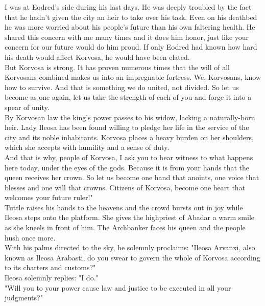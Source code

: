 I was at Eodred's side during his last days. He was deeply troubled by the fact that he hadn't given the city an heir to take over his task. Even on his deathbed he was more worried about his people's future than his own faltering health. He shared this concern with me many times and it does him honor, just like your concern for our future would do him proud. If only Eodred had known how hard his death would affect Korvosa, he would have been elated.\\

But Korvosa is strong. It has proven numerous times that the will of all Korvosans combined makes us into an impregnable fortress. We, Korvosans, know how to survive. And that is something we do united, not divided. So let us become as one again, let us take the strength of each of you and forge it into a spear of unity.\\

By Korvosan law the king's power passes to his widow, lacking a naturally-born heir. Lady Ileosa has been found willing to pledge her life in the service of the city and its noble inhabitants. Korvosa places a heavy burden on her shoulders, which she accepts with humility and a sense of duty.\\

And that is why, people of Korvosa, I ask you to bear witness to what happens here today, under the eyes of the gods. Because it is from your hands that the queen receives her crown. So let us become one hand that anoints, one voice that blesses and one will that crowns. Citizens of Korvosa, become one heart that welcomes your future ruler!"\\

Tuttle raises his hands to the heavens and the crowd bursts out in joy while Ileosa steps onto the platform. She gives the highpriest of Abadar a warm smile as she kneels in front of him. The Archbanker faces his queen and the people hush once more.\\

With his palms directed to the sky, he solemnly proclaims: "Ileosa Arvanxi, also known as Ileosa Arabasti, do you swear to govern the whole of Korvosa according to its charters and customs?"\\

Ileosa solemnly replies: "I do."\\

"Will you to your power cause law and justice to be executed in all your judgments?"\\

